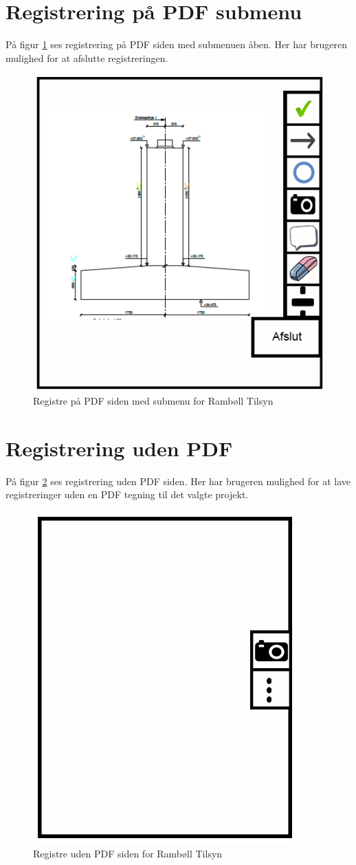 \section{Registrering på PDF submenu}\label{sec:RegPaaPDFSubMock}
På figur \ref{fig:RegPaaPDFSubMock} ses registrering på PDF siden med submenuen åben. Her har brugeren mulighed for at afslutte registreringen.

\begin{figure}[H]
	\centering
	\includegraphics[width=0.4\linewidth]{MockUps/Mock/Ramboell-PDF-Reg-sub}
	\caption{Registre på PDF siden med submenu for Rambøll Tilsyn}
	\label{fig:RegPaaPDFSubMock}
\end{figure}

\clearpage

\section{Registrering uden PDF}\label{sec:RegUdenPDFMock}
På figur \ref{fig:RegUdenPDFMock} ses registrering uden PDF siden. Her har brugeren mulighed for at lave registreringer uden en PDF tegning til det valgte projekt.

\begin{figure}[H]
	\centering
	\includegraphics[width=0.4\linewidth]{MockUps/Mock/Ramboell-TilsynUden}
	\caption{Registre uden PDF siden for Rambøll Tilsyn}
	\label{fig:RegUdenPDFMock}
\end{figure}


